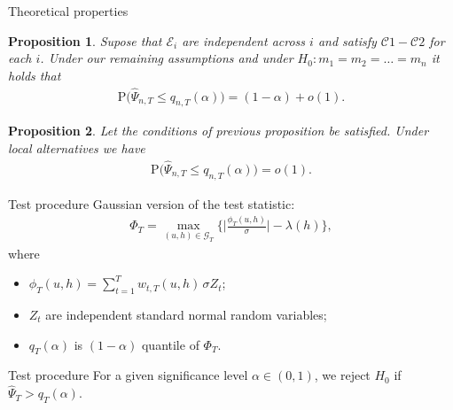 \documentclass[10pt]{beamer}
\newcommand{\Prob}{\mathrm{P}}
\newtheorem{prop}{Proposition}
\begin{document}
\begin{frame}{Theoretical properties}
\begin{prop}\label{prop-equality-1}
Supose that $\mathcal{E}_i$ are independent across $i$ and satisfy $\mathcal{C}1- \mathcal{C}2$ for each $i$. Under our remaining assumptions and under $H_0: m_1 = m_2 =\ldots = m_n$ it holds that 
\vspace{-3mm}
\begin{align*}
\Prob \big( \widehat{\Psi}_{n, T} \le q_{n,T}(\alpha) \big) = (1 - \alpha) + o(1).
\end{align*}
\end{prop}\pause

\begin{prop}\label{prop-equality-2}
Let the conditions of previous proposition be satisfied. Under local alternatives we have
\vspace{-3mm}
\begin{align*}
\Prob \big( \widehat{\Psi}_{n,T} \le q_{n,T}(\alpha) \big) = o(1).
\end{align*}
\end{prop}
\end{frame}

\begin{frame}{Test procedure}
Gaussian version of the test statistic:
\begin{align*}
\Phi_T = \max_{(u,h) \in \mathcal{G}_T} \Big\{ \Big|\frac{\phi_T(u,h)}{\sigma}\Big| - \lambda(h) \Big\},
\end{align*} 
\vspace{-3mm}
where
\begin{itemize}
\item $\phi_T(u,h) = \sum\nolimits_{t=1}^T w_{t,T}(u,h) \, \sigma Z_t$;
\item $Z_t$ are independent standard normal random variables;
\item $q_T(\alpha)$ is $(1 - \alpha)$ quantile of $\Phi_T$.
\end{itemize}\pause
\begin{block}{Test procedure}
For a given significance level $\alpha \in (0,1)$, we reject $H_0$ if $\widehat{\Psi}_T > q_T(\alpha)$.
\end{block}
\end{frame}
\end{document}
